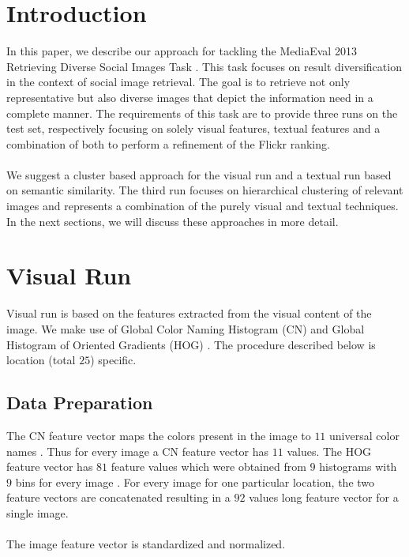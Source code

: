 \documentclass{acm_proc_article-me11_tweaked}
\begin{document}
\section{Introduction}
In this paper, we describe our approach for tackling the MediaEval 2013 Retrieving Diverse Social Images Task \cite{wn-overview-paper} \cite{mediaeval-diversephotos}.
This task focuses on result diversification in the context of social image retrieval. 
The goal is to retrieve not only representative but also diverse images that depict the information need in a complete manner.
The requirements of this task are to provide three runs on the test set, respectively focusing on solely visual features, textual features and a combination of both to perform a refinement of the Flickr ranking.
\\\\
We suggest a cluster based approach for the visual run and a textual run based on semantic similarity.
The third run focuses on hierarchical clustering of relevant images and represents a combination of the purely visual and textual techniques.
In the next sections, we will discuss these approaches in more detail.

\section{Visual Run}
\label{visual-similarity}

Visual run is based on the features extracted from the visual content of the image. We make use of Global Color Naming Histogram (CN) \cite{cn-paper} and Global Histogram of Oriented Gradients (HOG) \cite{hog-paper}. 
The procedure described below is location (total $25$) specific.
\subsection{Data Preparation}
The CN feature vector maps the colors present in the image to $11$ universal color names \cite{wn-overview-paper}. 
Thus for every image a CN feature vector has $11$ values. The HOG feature vector has $81$ feature values which were obtained from $9$ histograms with $9$ bins for every image \cite{wn-overview-paper}.
For every image for one particular location, the two feature vectors are concatenated resulting in a $92$ values long feature vector for a single image.
\\\\
The image feature vector is standardized and normalized.
\end{document}
